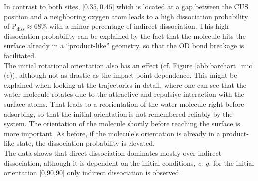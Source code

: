 \documentclass[11pt,DIV=13,BCOR=5mm,a4paper,headinclude]{scrbook}
\begin{document}
In contrast to both sites, [$0.35,0.45$] which is located at a gap between the CUS position and a neighboring oxygen atom leads to a high dissociation probability of P$_\textrm{diss}\approx 68\%$ with a minor percentage of indirect dissociation.
This high dissociation probability can be explained by the fact that the molecule hits the surface already in a ``product-like'' geometry, so that the OD bond breakage is facilitated.
\\
The initial rotational orientation also has an effect (cf.
Figure \ref{abb:barchart_mic}(c)), although not as drastic as the impact point dependence.
This might be explained when looking at the trajectories in detail, where one can see that the water molecule rotates due to the attractive and repulsive interaction with the surface atoms.
That leads to a reorientation of the water molecule right before adsorbing, so that the initial orientation is not remembered reliably by the system.
The orientation of the molecule shortly before reaching the surface is more important.
As before, if the molecule's orientation is already in a product-like state, the dissociation probability is elevated.
\\
The data shows that direct dissociation dominates mostly over indirect dissociation, although it is dependent on the initial conditions, \textit{e.
g.} for the initial orientation [0,90,90] only indirect dissociation is observed.

 
\end{document}
